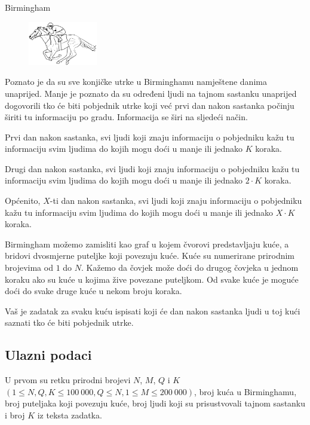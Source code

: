 \begin{statement}[
  problempoints=70,
  timelimit=1 sekunda,
  memorylimit=512 MiB,
]{Birmingham}

\setlength\intextsep{-0.1cm}
\begin{figure}
\centering
\includegraphics[width=0.27\textwidth]{img/birmingham.png}
\end{figure}

Poznato je da su sve konjičke utrke u Birminghamu namještene danima unaprijed.
Manje je poznato da su određeni ljudi na tajnom sastanku unaprijed dogovorili
tko će biti pobjednik utrke koji već prvi dan nakon sastanka počinju širiti
tu informaciju po gradu. Informacija se širi na sljedeći način.

Prvi dan nakon sastanka, svi ljudi koji znaju informaciju o pobjedniku kažu tu
informaciju svim ljudima do kojih mogu doći u manje ili jednako $K$ koraka.

Drugi dan nakon sastanka, svi ljudi koji znaju informaciju o pobjedniku kažu tu
informaciju svim ljudima do kojih mogu doći u manje ili jednako $2 \cdot K$ koraka.

Općenito, $X$-ti dan nakon sastanka, svi ljudi koji znaju informaciju o
pobjedniku kažu tu informaciju svim ljudima do kojih mogu doći u manje ili
jednako $X \cdot K$ koraka.

Birmingham možemo zamisliti kao graf u kojem čvorovi predstavljaju kuće, a
bridovi dvosmjerne puteljke koji povezuju kuće. Kuće su numerirane prirodnim
brojevima od $1$ do $N$. Kažemo da čovjek može doći do drugog čovjeka u jednom
koraku ako su kuće u kojima žive povezane puteljkom. Od svake kuće je
moguće doći do svake druge kuće u nekom broju koraka.

Vaš je zadatak za svaku kuću ispisati koji će dan nakon sastanka ljudi u toj
kući saznati tko će biti pobjednik utrke.

\subsection*{Ulazni podaci}
U prvom su retku prirodni brojevi $N$, $M$, $Q$ i $K$ $(1 \le N, Q, K \le 100\
000, Q \le N, 1 \le M \le 200\ 000)$, broj kuća u Birminghamu, broj puteljaka
koji povezuju kuće, broj ljudi koji su prisustvovali tajnom sastanku i broj
$K$ iz teksta zadatka.


\end{statement}
